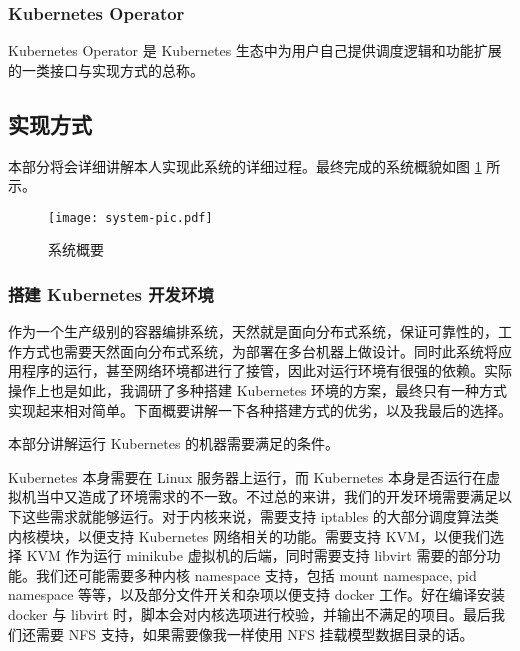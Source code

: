 \subsubsection{Kubernetes Operator}

Kubernetes Operator 是 Kubernetes 生态中为用户自己提供调度逻辑和功能扩展的一类接口与实现方式的总称。

\subsection{实现方式}

本部分将会详细讲解本人实现此系统的详细过程。最终完成的系统概貌如图 \ref{fig:system} 所示。

\begin{figure}

\centering

\texttt{[image: system-pic.pdf]}

\caption{系统概要}\label{fig:system}

\end{figure}

\subsubsection{搭建 Kubernetes 开发环境}

作为一个生产级别的容器编排系统，天然就是面向分布式系统，保证可靠性的，工作方式也需要天然面向分布式系统，为部署在多台机器上做设计。同时此系统将应用程序的运行，甚至网络环境都进行了接管，因此对运行环境有很强的依赖。实际操作上也是如此，我调研了多种搭建 Kubernetes 环境的方案，最终只有一种方式实现起来相对简单。下面概要讲解一下各种搭建方式的优劣，以及我最后的选择。


本部分讲解运行 Kubernetes 的机器需要满足的条件。

Kubernetes 本身需要在 Linux 服务器上运行，而 Kubernetes 本身是否运行在虚拟机当中又造成了环境需求的不一致。不过总的来讲，我们的开发环境需要满足以下这些需求就能够运行。对于内核来说，需要支持 iptables 的大部分调度算法类内核模块，以便支持 Kubernetes 网络相关的功能。需要支持 KVM，以便我们选择 KVM 作为运行 minikube 虚拟机的后端，同时需要支持 libvirt 需要的部分功能。我们还可能需要多种内核 namespace 支持，包括 mount namespace, pid namespace 等等，以及部分文件开关和杂项以便支持 docker 工作。好在编译安装 docker 与 libvirt 时，脚本会对内核选项进行校验，并输出不满足的项目。最后我们还需要 NFS 支持，如果需要像我一样使用 NFS 挂载模型数据目录的话。

